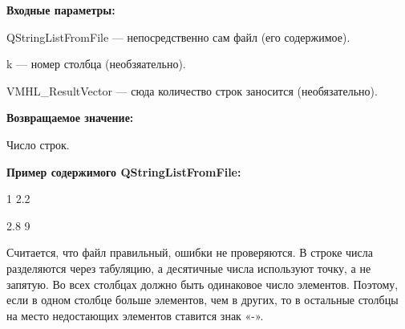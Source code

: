 \textbf{Входные параметры:}

QStringListFromFile --- непосредственно сам файл (его содержимое).

k --- номер столбца (необзяательно).

 VMHL\_ResultVector --- сюда количество строк заносится (необязательно).

\textbf{Возвращаемое значение:}

Число строк.

\textbf{Пример содержимого QStringListFromFile:}

1	2.2

2.8	9

Считается, что файл правильный, ошибки не проверяются. В строке числа разделяются через табуляцию, а десятичные числа используют точку, а не запятую. Во всех столбцах должно быть одинаковое число элементов. Поэтому, если в одном столбце больше элементов, чем в других, то в остальные столбцы на место недостающих элементов ставится знак «-».